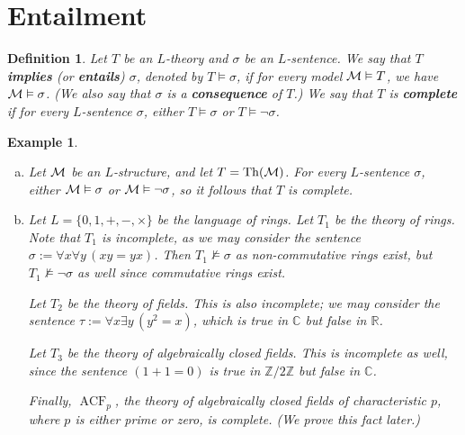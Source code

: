 \documentclass[10pt]{article}
\newcommand{\R}{\mathbb{R}}
\newcommand{\C}{\mathbb{C}}
\newcommand{\Z}{\mathbb{Z}}
\DeclareMathOperator{\Th}{Th}
\DeclareMathOperator{\ACF}{ACF}
\theoremstyle{newstyle}
\newtheorem{defn}[thm]{Definition}
\newtheorem{exmp}[thm]{Example}
\begin{document}
\newpage 
\section{Entailment}

\begin{defn}
Let $T$ be an $L$-theory and $\sigma$ be an $L$-sentence. We say that $T$ {\bf implies}
(or {\bf entails}) $\sigma$, denoted by $T \vDash \sigma$, if for every model 
${\cal M} \vDash T$, we have ${\cal M} \vDash \sigma$. 
(We also say that $\sigma$ is a {\bf consequence} of $T$.) 
We say that $T$ is {\bf complete} if for every $L$-sentence $\sigma$, either 
$T \vDash \sigma$ or $T \vDash \neg \sigma$. 
\end{defn}

\begin{exmp}~
\begin{enumerate}[(a)]
    \item Let ${\cal M}$ be an $L$-structure, and let $T = \Th({\cal M})$. For every 
    $L$-sentence $\sigma$, either ${\cal M} \vDash \sigma$ or 
    ${\cal M} \vDash \neg \sigma$, so it follows that $T$ is complete. 
    \item Let $L = \{0, 1, +, -, \times\}$ be the language of rings. 
    Let $T_1$ be the theory of rings. Note that $T_1$ is incomplete, as 
    we may consider the sentence $\sigma := \forall x \forall y \, (xy = yx)$. 
    Then $T_1 \nvDash \sigma$ as non-commutative rings exist, 
    but $T_1 \nvDash \neg \sigma$ as well since commutative rings exist. 
    
    Let $T_2$ be the theory of fields. This is also incomplete; we may consider the 
    sentence $\tau := \forall x \exists y \, (y^2 = x)$, which is true in $\C$ but false in $\R$. 
    
    Let $T_3$ be the theory of algebraically closed fields. This is incomplete as well, 
    since the sentence $(1 + 1 = 0)$ is true in $\Z/2\Z$ but false in $\C$.
    
    Finally, $\ACF_p$, the theory of algebraically closed fields of characteristic $p$, 
    where $p$ is either prime or zero, is complete. (We prove this fact later.)
\end{enumerate}
\end{exmp}
\end{document}
